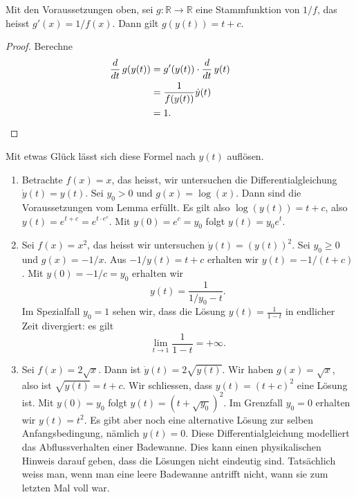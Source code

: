 \documentclass[../main.tex]{subfiles}
\begin{document}
\begin{lemma*}
  Mit den Voraussetzungen oben,
  sei $g \colon \mathbb{R} \to \mathbb{R}$ eine Stammfunktion
  von $1/f$, das heisst $g'(x) = 1/f(x)$.
  Dann gilt $g(y(t)) = t + c$.
\end{lemma*}

\begin{proof}
  Berechne
  \begin{align*}
    \frac{d}{dt} \, g(y(t))
    &= g'(y(t)) \cdot \frac{d}{dt} \, y(t)\\
    &= \frac{1}{f(y(t))} \dot y(t) \\
    &= 1. && \qedhere
  \end{align*}
\end{proof}

Mit etwas Glück lässt sich diese Formel nach $y(t)$ auflösen.

\begin{examples}
  \leavevmode
  \begin{enumerate}[(1)]
    \item Betrachte $f(x) = x$, das heisst, wir untersuchen
      die Differentialgleichung $\dot y(t) = y(t)$.
      Sei $y_0 > 0$ und $g(x) = \log(x)$.
      Dann sind die Voraussetzungen vom Lemma erfüllt.
      Es gilt also $\log(y(t)) = t + c$, also
      $y(t) = e^{t + c} = e^{t \cdot e^c}$.
      Mit $y(0) = e^c = y_0$ folgt $y(t) = y_0 e^t$.
    \item Sei $f(x) = x^2$, das heisst
      wir untersuchen $\dot y(t) = {(y(t))}^2$.
      Sei $y_0 \geq 0$ und
      $g(x) = -1/x$.
      Aus $-1/y(t) = t + c$ erhalten wir
      $y(t) = -1/(t + c)$.
      Mit  $y(0) = -1/c = y_0$ erhalten wir
      \[
        y(t) = \frac{1}{1/y_0 - t}.
      \]
      Im Spezialfall $y_0 = 1$ sehen wir,
      dass die Lösung $y(t) = \frac{1}{1-t}$ 
      in endlicher Zeit divergiert: es gilt
      \[
        \lim_{t \to 1} \frac{1}{1-t} = +\infty.
      \]
    \item Sei $f(x) = 2\sqrt x$. Dann ist
      $\dot y (t) = 2 \sqrt{y(t)}$.
      Wir haben $g(x) = \sqrt x$,
      also ist $\sqrt{y(t)} = t + c$.
      Wir schliessen, dass
      $y(t) = {(t + c)}^2$ eine Lösung
      ist.
      Mit $y(0) = y_0$ folgt
      $y(t) = {(t + \sqrt {y_0})}^2$.
      Im Grenzfall  $y_0 = 0$ 
      erhalten wir $y(t) = t^2$.
      Es gibt aber noch eine alternative
      Lösung zur selben Anfangsbedingung,
      nämlich $y(t) = 0$.
      Diese Differentialgleichung modelliert das
      Abflussverhalten einer Badewanne.
      Dies kann einen physikalischen Hinweis darauf geben, dass
      die Lösungen nicht eindeutig sind. Tatsächlich
      weiss man, wenn man eine leere Badewanne antrifft
      nicht, wann sie zum letzten Mal voll war.
  \end{enumerate}
\end{examples}
\end{document}
